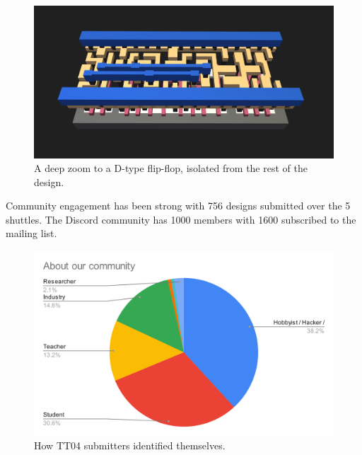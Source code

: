 \begin{figure}[htp]
\centering
\includegraphics[width=\columnwidth]{./Figs/gh action d type flop 3d closeup.png}
\caption{A deep zoom to a D-type flip-flop, isolated from the rest of the design.}
\label{fig:zoom_d_flip_flop}
\end{figure}

Community engagement has been strong with 756 designs submitted over the 5 shuttles.
The Discord community has 1000 members with 1600 subscribed to the mailing list.

\begin{figure}[htp]
\centering
\includegraphics[width=\columnwidth]{./Figs/about our community pie chart.png}
\caption{How TT04 submitters identified themselves.}
\label{fig:TT02_submitters}
\end{figure}
